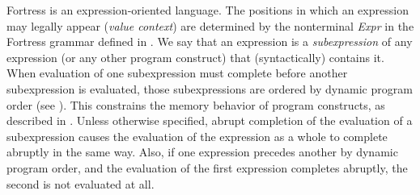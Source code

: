 %
%
%
%

Fortress is an expression-oriented language.
The positions in which an expression may legally appear
(\emph{value context})
are determined by the nonterminal \emph{Expr}
in the Fortress grammar defined in .
We say that an expression is a \emph{subexpression}
of any expression (or any other program construct)
that (syntactically) contains it.
When evaluation of one subexpression
must complete before another subexpression is evaluated,
those subexpressions are ordered by dynamic program order
(see ).
This constrains the memory behavior of program constructs,
as described in .
Unless otherwise specified,
abrupt completion of the evaluation of a subexpression
causes the evaluation of the expression as a whole
to complete abruptly in the same way.
Also, if one expression precedes another by dynamic program order,
and the evaluation of the first expression completes abruptly,
the second is not evaluated at all.
